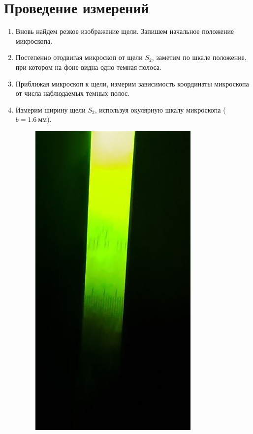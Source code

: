 \documentclass[14pt, a4paper]{report}
\begin{document}
\section{Проведение измерений}

\begin{enumerate}

\item Вновь найдем резкое изображение щели. Запишем начальное положение микроскопа.

\item Постепенно отодвигая микроскоп от щели $S_2$, заметим по шкале положение, при котором на фоне видна одно темная полоса.

\item Приближая микроскоп к щели, измерим зависимость координаты микроскопа от числа наблюдаемых темных полос.

\item Измерим ширину щели $S_2$, используя окулярную шкалу микроскопа ($b=1.6\ мм$).

\begin{figure}[H]
\centering
\includegraphics[scale=0.6]{../images/431_3}
\end{figure}

\end{enumerate}
\end{document}
